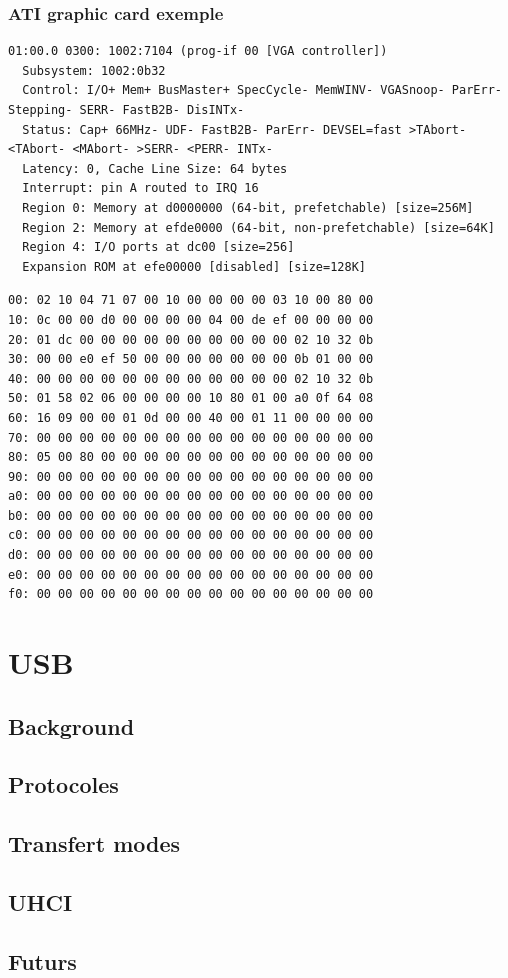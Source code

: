 \begin{frame}[fragile]
\frametitle{ATI graphic card exemple}
\begin{verbatim}
01:00.0 0300: 1002:7104 (prog-if 00 [VGA controller])
  Subsystem: 1002:0b32
  Control: I/O+ Mem+ BusMaster+ SpecCycle- MemWINV- VGASnoop- ParErr- Stepping- SERR- FastB2B- DisINTx-
  Status: Cap+ 66MHz- UDF- FastB2B- ParErr- DEVSEL=fast >TAbort- <TAbort- <MAbort- >SERR- <PERR- INTx-
  Latency: 0, Cache Line Size: 64 bytes
  Interrupt: pin A routed to IRQ 16
  Region 0: Memory at d0000000 (64-bit, prefetchable) [size=256M]
  Region 2: Memory at efde0000 (64-bit, non-prefetchable) [size=64K]
  Region 4: I/O ports at dc00 [size=256]
  Expansion ROM at efe00000 [disabled] [size=128K]
\end{verbatim}

\begin{verbatim}
00: 02 10 04 71 07 00 10 00 00 00 00 03 10 00 80 00
10: 0c 00 00 d0 00 00 00 00 04 00 de ef 00 00 00 00
20: 01 dc 00 00 00 00 00 00 00 00 00 00 02 10 32 0b
30: 00 00 e0 ef 50 00 00 00 00 00 00 00 0b 01 00 00
40: 00 00 00 00 00 00 00 00 00 00 00 00 02 10 32 0b
50: 01 58 02 06 00 00 00 00 10 80 01 00 a0 0f 64 08
60: 16 09 00 00 01 0d 00 00 40 00 01 11 00 00 00 00
70: 00 00 00 00 00 00 00 00 00 00 00 00 00 00 00 00
80: 05 00 80 00 00 00 00 00 00 00 00 00 00 00 00 00
90: 00 00 00 00 00 00 00 00 00 00 00 00 00 00 00 00
a0: 00 00 00 00 00 00 00 00 00 00 00 00 00 00 00 00
b0: 00 00 00 00 00 00 00 00 00 00 00 00 00 00 00 00
c0: 00 00 00 00 00 00 00 00 00 00 00 00 00 00 00 00
d0: 00 00 00 00 00 00 00 00 00 00 00 00 00 00 00 00
e0: 00 00 00 00 00 00 00 00 00 00 00 00 00 00 00 00
f0: 00 00 00 00 00 00 00 00 00 00 00 00 00 00 00 00
\end{verbatim}
\end{frame}

\section{USB}
\subsection*{Background}
\subsection{Protocoles}
\subsection{Transfert modes}
\subsection{UHCI}
\subsection{Futurs}



